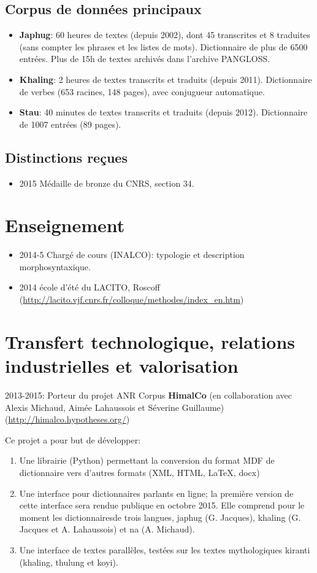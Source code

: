 \documentclass[oldfontcommands,oneside,a4paper,11pt]{article}
\begin{document}
\subsection{Corpus de données principaux}
\begin{itemize}
\item \textbf{Japhug}: 60 heures de textes (depuis 2002), dont 45 transcrites et 8 traduites (sans compter les phrases et les listes de mots). Dictionnaire de plus de 6500 entrées. Plus de 15h de textes archivés dans l'archive PANGLOSS.
\item \textbf{Khaling}: 2 heures de textes transcrits et traduits (depuis 2011). Dictionnaire de verbes (653 racines, 148 pages), avec conjugueur automatique.
\item \textbf{Stau}: 40 minutes de textes transcrits et traduits (depuis 2012). Dictionnaire de 1007 entrées (89 pages).
  \end{itemize}
  
\subsection{Distinctions reçues}  
\begin{itemize}
\item 2015 Médaille de bronze du CNRS, section 34.
\end{itemize}
  
\section{Enseignement}
\begin{itemize}
\item 2014-5 Chargé de cours (INALCO): typologie et description morphosyntaxique.
\item 2014 école d'été du LACITO, Roscoff (\url{http://lacito.vjf.cnrs.fr/colloque/methodes/index\_en.htm})
\end{itemize}

\section{Transfert technologique, relations industrielles et valorisation}
2013-2015: Porteur du projet ANR Corpus \textbf{HimalCo} (en collaboration avec Alexis Michaud, Aimée Lahaussois et Séverine Guillaume) (\url{http://himalco.hypotheses.org/})

Ce projet a pour but de développer:

\begin{enumerate}
\item Une librairie (Python) permettant la conversion du format MDF de dictionnaire vers d'autres formats (XML, HTML, \LaTeX, docx)
\item Une interface pour dictionnaires parlants en ligne; la première version de cette interface sera rendue publique en octobre 2015. Elle comprend pour le moment les dictionnairesde trois langues, japhug (G. Jacques), khaling (G. Jacques et A. Lahaussois) et na (A. Michaud).
\item Une interface de textes parallèles, testées sur les textes mythologiques kiranti (khaling, thulung et koyi).
\end{enumerate}
\end{document}
